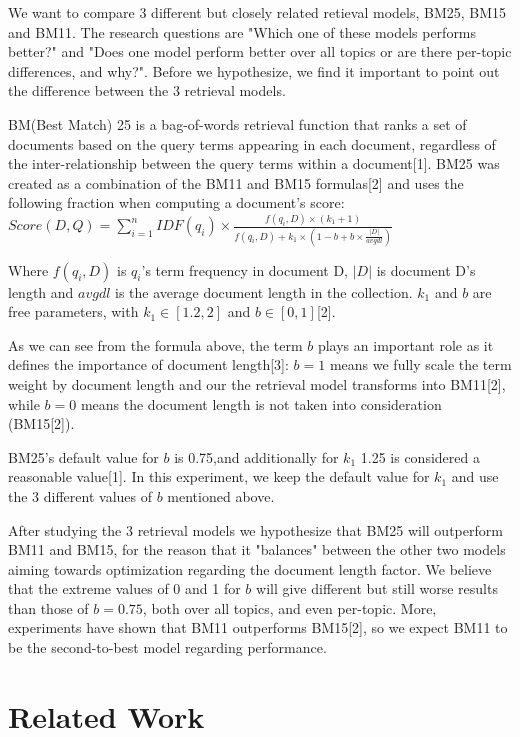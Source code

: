 \documentclass[letterpaper,11pt]{article}
\begin{document}
We want to compare 3 different but closely related retieval models, BM25, BM15 and BM11. The research questions are "Which one of these models performs better?" and "Does one model perform better over all topics or are there per-topic differences, and why?". Before we hypothesize, we find it important to point out the difference between the 3 retrieval models.

BM(Best Match) 25 is a bag-of-words retrieval function that ranks a set of documents based on the query terms appearing in each document, regardless of the inter-relationship between the query terms within a document[1]. BM25 was created as a combination of the BM11 and BM15 formulas[2] and uses the following fraction when computing a document's score:  
\newpage
$Score(D,Q) = \sum^n_{i=1}{IDF(q_i)} \times 	\frac{f(q_i,D) \times (k_1 +1)}{f(q_i,D) + k_1 \times (1-b+b\times \frac{|D|}{avgdl})}$

Where  $f(q_i,D)$ is $q_i$'s term frequency in document D, $|D|$ is document D's length and $avgdl$ is the average document length in the collection. $k_1$ and $b$ are free parameters, with $k_1 \in [1.2,2]$ and $b \in [0,1]$[2]. 



As we can see from the formula above, the term $b$ plays an important role as it defines the importance of document length[3]: $b=1$ means we fully scale the term weight by document length and our the retrieval model transforms into BM11[2], while $b=0$ means the document length is not taken into consideration (BM15[2]).

BM25's default value for $b$ is 0.75,and additionally for $k_1$ 1.25 is considered a reasonable value[1]. In this experiment, we keep the default value for $k_1$ and use the 3 different values of $b$ mentioned above.

After studying the 3 retrieval models we hypothesize that BM25 will outperform BM11 and BM15, for the reason that it "balances" between the other two models aiming towards optimization regarding the document length factor. We believe that the extreme values of 0 and 1 for $b$ will give different but still worse results than those of $b=0.75$, both over all topics, and even per-topic. More, experiments have shown that BM11 outperforms BM15[2], so we expect BM11 to be the second-to-best model regarding performance.




\section{Related Work}
\end{document}
